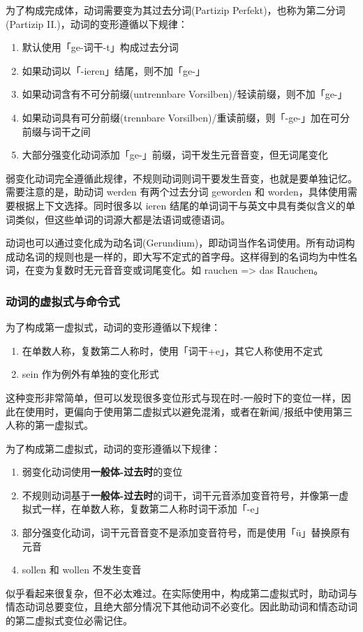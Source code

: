 为了构成完成体，动词需要变为其过去分词(Partizip Perfekt)，也称为第二分词(Partizip II.)，动词的变形遵循以下规律：
\begin{enumerate}[leftmargin=3.5em, topsep=0pt, itemsep=0pt, parsep=0pt]
    \item 默认使用「ge-词干-t」构成过去分词
    \item 如果动词以「-ieren」结尾，则不加「ge-」
    \item 如果动词含有不可分前缀(untrennbare Vorsilben)/轻读前缀，则不加「ge-」
    \item 如果动词具有可分前缀(trennbare Vorsilben)/重读前缀，则「-ge-」加在可分前缀与词干之间
    \item 大部分强变化动词添加「ge-」前缀，词干发生元音音变，但无词尾变化
\end{enumerate}
弱变化动词完全遵循此规律，不规则动词则词干要发生音变，也就是要单独记忆。需要注意的是，助动词 werden 有两个过去分词 geworden 和 worden，具体使用需要根据上下文选择。同时很多以 ieren 结尾的单词词干与英文中具有类似含义的单词类似，但这些单词的词源大都是法语词或德语词。

动词也可以通过变化成为动名词(Gerundium)，即动词当作名词使用。所有动词构成动名词的规则也是一样的，即大写不定式的首字母。这样得到的名词均为中性名词，在变为复数时无元音音变或词尾变化。如 rauchen => das Rauchen。

\subsubsection{动词的虚拟式与命令式}

为了构成第一虚拟式，动词的变形遵循以下规律：
\begin{enumerate}[leftmargin=3.5em, topsep=0pt, itemsep=0pt, parsep=0pt]
    \item 在单数人称，复数第二人称时，使用「词干+e」，其它人称使用不定式
    \item sein 作为例外有单独的变化形式
\end{enumerate}
这种变形非常简单，但可以发现很多变位形式与现在时-一般时下的变位一样，因此在使用时，更偏向于使用第二虚拟式以避免混淆，或者在新闻/报纸中使用第三人称的第一虚拟式。

为了构成第二虚拟式，动词的变形遵循以下规律：
\begin{enumerate}[leftmargin=3.5em, topsep=0pt, itemsep=0pt, parsep=0pt]
    \item 弱变化动词使用{\bf 一般体-过去时}的变位
    \item 不规则动词基于{\bf 一般体-过去时}的词干，词干元音添加变音符号，并像第一虚拟式一样，在单数人称，复数第二人称时词干添加「-e」
    \item 部分强变化动词，词干元音音变不是添加变音符号，而是使用「ü」替换原有元音
    \item sollen 和 wollen 不发生变音
\end{enumerate}
似乎看起来很复杂，但不必太难过。在实际使用中，构成第二虚拟式时，助动词与情态动词总要变位，且绝大部分情况下其他动词不必变化。因此助动词和情态动词的第二虚拟式变位必需记住。

